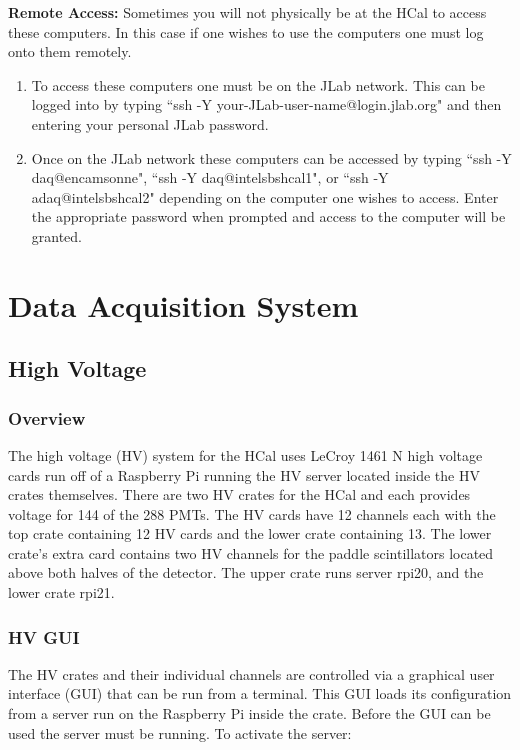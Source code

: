 \documentclass[oneside]{book}   %
\begin{document}
\textbf{\large{Remote Access:}}
Sometimes you will not physically be at the HCal to access these computers. In this case if one wishes to use the computers one must log onto them remotely.

\begin{enumerate}
	\item To access these computers one must be on the JLab network. This can be logged into by typing ``ssh -Y your-JLab-user-name@login.jlab.org" and then entering your personal JLab password. 
	\item Once on the JLab network these computers can be accessed by typing ``ssh -Y daq@encamsonne", ``ssh -Y  daq@intelsbshcal1", or ``ssh -Y  adaq@intelsbshcal2" depending on the computer one wishes to access. Enter the appropriate password when prompted and access to the computer will be granted.
\end{enumerate}


\chapter{Data Acquisition System}
\label{ch:daq}
\section{High Voltage}
\label{sec:hv}

\subsection{Overview}
\label{ssec:hv_overview}

The high voltage (HV) system for the HCal uses LeCroy 1461 N high voltage cards run off of a Raspberry Pi running the HV server located inside the HV crates themselves. There are two HV crates for the HCal and each provides voltage for 144 of the 288 PMTs. The HV cards have 12 channels each with the top crate containing 12 HV cards and the lower crate containing 13. The lower crate's extra card contains two HV channels for the paddle scintillators located above both halves of the detector. The upper crate runs server rpi20, and the lower crate rpi21. 

\subsection{HV GUI}
\label{ssec:gui}

The HV crates and their individual channels are controlled via a graphical user interface (GUI) that can be run from a terminal. This GUI loads its configuration from a server run on the Raspberry Pi inside the crate. Before the GUI can be used the server must be running. To activate the server:
\end{document}
